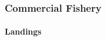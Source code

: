 \documentclass[11pt,
  english,
  a4paper,
]{article}
\begin{document}
\leavevmode\tagmcend\tagstructend


\hypertarget{commercial-fishery}{%
\subsubsection{Commercial Fishery}\label{commercial-fishery}}

\leavevmode\tagmcend\tagstructend


\hypertarget{landings}{%
\paragraph{Landings}\label{landings}}

\leavevmode\tagmcend\tagstructend

\end{document}
